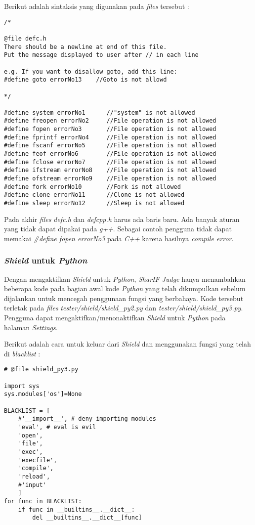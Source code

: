 Berikut adalah sintaksis yang digunakan pada \textit{files} tersebut :

\begin{lstlisting}[basicstyle=\ttfamily, frame=single,
columns=fullflexible, keepspaces=true, breaklines=true, label=ls:20]
/*

@file defc.h
There should be a newline at end of this file.
Put the message displayed to user after // in each line

e.g. If you want to disallow goto, add this line:
#define goto errorNo13    //Goto is not allowd

*/

#define system errorNo1      //"system" is not allowed
#define freopen errorNo2     //File operation is not allowed
#define fopen errorNo3       //File operation is not allowed
#define fprintf errorNo4     //File operation is not allowed
#define fscanf errorNo5      //File operation is not allowed
#define feof errorNo6        //File operation is not allowed
#define fclose errorNo7      //File operation is not allowed
#define ifstream errorNo8    //File operation is not allowed
#define ofstream errorNo9    //File operation is not allowed
#define fork errorNo10       //Fork is not allowed
#define clone errorNo11      //Clone is not allowed
#define sleep errorNo12      //Sleep is not allowed
\end{lstlisting}

Pada akhir \textit{files} \textit{defc.h} dan \textit{defcpp.h} harus ada baris baru. Ada banyak aturan yang tidak dapat dipakai pada \textit{g++}. Sebagai contoh pengguna tidak dapat memakai \textit{\#define fopen errorNo3} pada \textit{C++} karena hasilnya \textit{compile error}.

\subsubsection{\textit{Shield} untuk \textit{Python}}
\label{subsubsec:shield_python}
Dengan mengaktifkan \textit{Shield} untuk \textit{Python}, \textit{SharIF Judge} hanya menambahkan beberapa kode pada bagian awal kode \textit{Python} yang telah dikumpulkan sebelum dijalankan untuk mencegah penggunaan fungsi yang berbahaya. Kode tersebut terletak pada \textit{files} \textit{tester/shield/shield\_py2.py} dan \textit{tester/shield/shield\_py3.py}. Pengguna dapat mengaktifkan/menonaktifkan \textit{Shield} untuk \textit{Python} pada halaman \textit{Settings}.

Berikut adalah cara untuk keluar dari \textit{Shield} dan menggunakan fungsi yang telah di \textit{blacklist} :

\begin{lstlisting}[basicstyle=\ttfamily, frame=single,
columns=fullflexible, keepspaces=true, breaklines=true, label=ls:21]
# @file shield_py3.py

import sys
sys.modules['os']=None

BLACKLIST = [
	#'__import__', # deny importing modules
	'eval', # eval is evil
	'open',
	'file',
	'exec',
	'execfile',
	'compile',
	'reload',
	#'input'
	]
for func in BLACKLIST:
	if func in __builtins__.__dict__:
		del __builtins__.__dict__[func]
\end{lstlisting}

